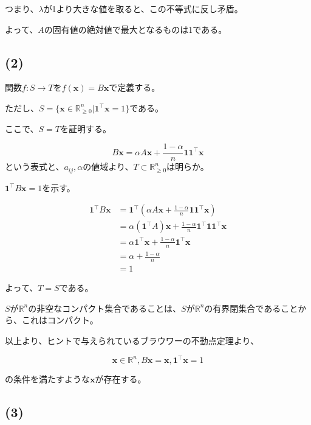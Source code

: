 \documentclass[a4paper, 10pt, dvipdfmx]{jlreq}
\begin{document}
つまり、$\lambda$が1より大きな値を取ると、この不等式に反し矛盾。

よって、$A$の固有値の絶対値で最大となるものは1である。

\subsection*{(2)}

関数$f\colon S \to T$を$f(\bm{x})=B\bm{x}$で定義する。

ただし、$S=\{\bm{x}\in \mathbb{R}_{\geq 0}^n | \bm{1}^\top \bm{x}=1 \}$である。

ここで、$S=T$を証明する。

\begin{equation*}
  B\bm{x}=\alpha A\bm{x}+\frac{1-\alpha}{n}\bm{1}\bm{1}^\top \bm{x}
\end{equation*}
という表式と、$a_{ij},\alpha$の値域より、$T \subset \mathbb{R}_{\geq 0}^n$は明らか。

$\bm{1}^\top B\bm{x}=1$を示す。

\begin{align*}
  \bm{1}^\top B\bm{x} & =\bm{1}^\top \left(\alpha A\bm{x}+\frac{1-\alpha}{n}\bm{1}\bm{1}^\top \bm{x}\right)  \\
                      & =\alpha (\bm{1}^\top A)\bm{x}+\frac{1-\alpha}{n}\bm{1}^\top \bm{1}\bm{1}^\top \bm{x} \\
                      & =\alpha \bm{1}^\top \bm{x}+\frac{1-\alpha}{n}\bm{1}^\top \bm{x}                      \\
                      & =\alpha+\frac{1-\alpha}{n}                                                           \\
                      & =1
\end{align*}

よって、$T=S$である。

$S$が$\mathbb{R}^n$の非空なコンパクト集合であることは、$S$が$\mathbb{R}^n$の有界閉集合であることから、これはコンパクト。

以上より、ヒントで与えられているブラウワーの不動点定理より、

\begin{equation*}
  \bm{x}\in \mathbb{R}^n,
  B\bm{x}=\bm{x}, \bm{1}^\top \bm{x}=1
\end{equation*}

の条件を満たすような$\bm{x}$が存在する。

\subsection*{(3)}
\end{document}
